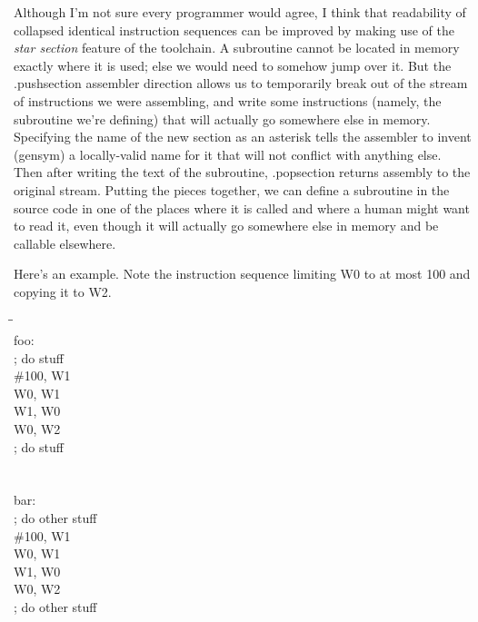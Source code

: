 Although I'm not sure every programmer would agree, I think that readability
of collapsed identical instruction sequences can be improved by making use
of the \emph{star section} feature of the toolchain.  A subroutine cannot be
located in memory exactly where it is used; else we would need to somehow
jump over it.  But the .pushsection assembler direction allows us to
temporarily break out of the stream of instructions we were assembling, and
write some instructions (namely, the subroutine we're defining) that will
actually go somewhere else in memory.  Specifying the name of the new
section as an asterisk tells the assembler to invent (gensym) a locally-valid
name for it that will not conflict with anything else.  Then after writing
the text of the subroutine, .popsection returns assembly to the original
stream.  Putting the pieces together, we can define a subroutine in the
source code in one of the places where it is called and where a human might
want to read it, even though it will actually go somewhere else in memory
and be callable elsewhere.

Here's an example.  Note the instruction sequence limiting W0 to at most 100
and copying it to W2.
\begin{tabbing}
\qquad\=\qquad\qquad\=\kill
\\
foo:\\
\>; do stuff\\
\>\>\#100, W1\\
\>\>W0, W1\\
\>\>W1, W0\\
\>\>W0, W2\\
\>; do stuff\\
\>\\
\\
bar:\\
\>; do other stuff\\
\>\>\#100, W1\\
\>\>W0, W1\\
\>\>W1, W0\\
\>\>W0, W2\\
\>; do other stuff\\
\>\\
\end{tabbing}

